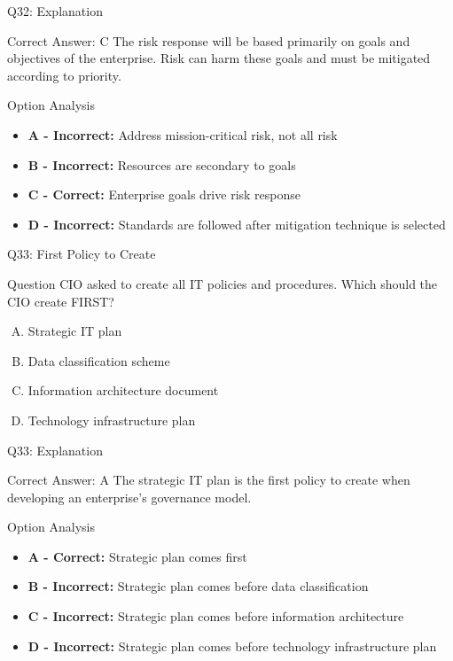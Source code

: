 \documentclass{beamer}
\begin{document}
	\begin{frame}{Q32: Explanation}
		\begin{block}{Correct Answer: C}
			The risk response will be based primarily on goals and objectives of the enterprise. Risk can harm these goals and must be mitigated according to priority.
		\end{block}
		\begin{block}{Option Analysis}
			\begin{itemize}
				\item \textbf{A - Incorrect:} Address mission-critical risk, not all risk
				\item \textbf{B - Incorrect:} Resources are secondary to goals
				\item \textbf{C - Correct:} Enterprise goals drive risk response
				\item \textbf{D - Incorrect:} Standards are followed after mitigation technique is selected
			\end{itemize}
		\end{block}
	\end{frame}
	
	\begin{frame}{Q33: First Policy to Create}
		\begin{block}{Question}
			CIO asked to create all IT policies and procedures. Which should the CIO create FIRST?
		\end{block}
		\begin{enumerate}[(A)]
			\item Strategic IT plan
			\item Data classification scheme
			\item Information architecture document
			\item Technology infrastructure plan
		\end{enumerate}
	\end{frame}
	
	\begin{frame}{Q33: Explanation}
		\begin{block}{Correct Answer: A}
			The strategic IT plan is the first policy to create when developing an enterprise's governance model.
		\end{block}
		\begin{block}{Option Analysis}
			\begin{itemize}
				\item \textbf{A - Correct:} Strategic plan comes first
				\item \textbf{B - Incorrect:} Strategic plan comes before data classification
				\item \textbf{C - Incorrect:} Strategic plan comes before information architecture
				\item \textbf{D - Incorrect:} Strategic plan comes before technology infrastructure plan
			\end{itemize}
		\end{block}
	\end{frame}
	
\end{document}
